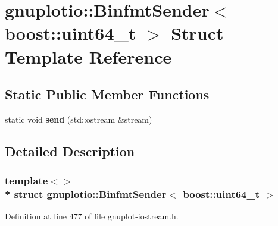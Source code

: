 \hypertarget{structgnuplotio_1_1_binfmt_sender_3_01boost_1_1uint64__t_01_4}{}\section{gnuplotio\+:\+:Binfmt\+Sender$<$ boost\+:\+:uint64\+\_\+t $>$ Struct Template Reference}
\label{structgnuplotio_1_1_binfmt_sender_3_01boost_1_1uint64__t_01_4}
\subsection*{Static Public Member Functions}
\begin{DoxyCompactItemize}
\item 
static void {\bfseries send} (std\+::ostream \&stream)\hypertarget{structgnuplotio_1_1_binfmt_sender_3_01boost_1_1uint64__t_01_4_a9f57162a6baf940675236235556f62ba}{}\label{structgnuplotio_1_1_binfmt_sender_3_01boost_1_1uint64__t_01_4_a9f57162a6baf940675236235556f62ba}

\end{DoxyCompactItemize}


\subsection{Detailed Description}
\subsubsection*{template$<$$>$\\*
struct gnuplotio\+::\+Binfmt\+Sender$<$ boost\+::uint64\+\_\+t $>$}



Definition at line 477 of file gnuplot-\/iostream.\+h.

